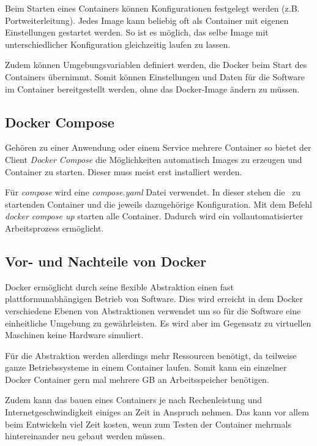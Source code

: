 Beim Starten eines Containers können Konfigurationen festgelegt werden (z.B. Portweiterleitung).
Jedes Image kann beliebig oft als Container mit eigenen Einstellungen gestartet werden. So ist es möglich, das selbe Image mit unterschiedlicher Konfiguration gleichzeitig laufen zu lassen.

Zudem können Umgebungsvariablen definiert werden, die Docker beim Start des Containers übernimmt. Somit können Einstellungen und Daten für die Software im Container bereitgestellt werden, ohne das Docker-Image ändern zu müssen.

\cite{dockerDummies}

\subsection{Docker Compose }
Gehören zu einer Anwendung oder einem Service mehrere Container so bietet der Client \emph{Docker Compose} die Möglichkeiten automatisch Images zu erzeugen und Container zu starten. Dieser muss meist erst installiert werden.

Für \emph{compose} wird eine \emph{compose.yaml} Datei verwendet. In dieser stehen die  zu startenden Container und die jeweils dazugehörige Konfiguration.
Mit dem Befehl \emph{docker compose up} starten alle Container.
Dadurch wird ein vollautomatisierter Arbeitsprozess ermöglicht.

\subsection{Vor- und Nachteile von Docker }
Docker ermöglicht durch seine flexible Abstraktion einen fast plattformunabhängigen Betrieb von Software. Dies wird erreicht in dem Docker verschiedene Ebenen von Abstraktionen verwendet um so für die Software eine einheitliche Umgebung zu gewährleisten. Es wird aber im Gegensatz zu virtuellen Maschinen keine Hardware simuliert.

Für die Abstraktion werden allerdings mehr Ressourcen benötigt, da teilweise ganze Betriebssysteme in einem Container laufen. Somit kann ein einzelner Docker Container gern mal mehrere GB an Arbeitsspeicher benötigen.

Zudem kann das bauen eines Containers je nach Rechenleistung und Internetgeschwindigkeit einiges an Zeit in Anspruch nehmen. Das kann vor allem beim Entwickeln viel Zeit kosten, wenn zum Testen der Container mehrmals hintereinander neu gebaut werden müssen.

\cite{dockerDummies}
\cite{dockerComposeOverview}

